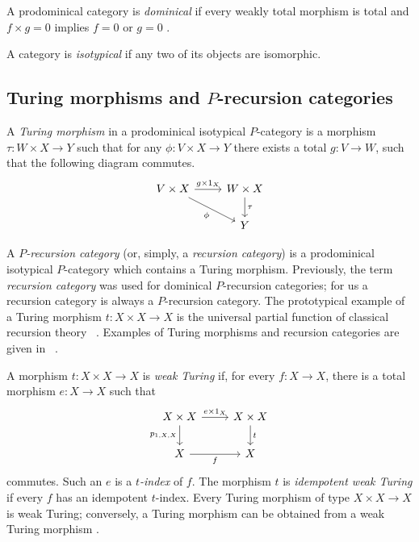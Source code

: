 \documentclass[letterpaper,10pt]{amsart}
\theoremstyle{plain}
\theoremstyle{definition}
\newcommand{\MAP}[3]{{#1}:{#2}\rightarrow{#3}}
\begin{document}
A prodominical category is \textit{dominical} if every weakly total
morphism is total and $f\times g=0$ implies $f=0$ or $g=0$
\cite[p.~36]{leng}.

A category is \textit{isotypical} if any two of its objects are isomorphic.

\subsection{Turing morphisms and \texorpdfstring{$P$}{P}-recursion categories}
A {\it Turing morphism} in a prodominical isotypical $P$-category is a morphism %
$\MAP{\tau}{W\times X}{Y}$ such that for any $\MAP{\phi}{V\times
X}{Y}$ there exists a total $\MAP{g}{V}{W}$, such that the
following diagram commutes.
\[
\begin{tikzcd}
V\times X \arrow[r,"g\times1_X"] \arrow[dr,"\phi"']
  & W\times X \arrow[d,"\tau"] \\
  & Y
\end{tikzcd}
\]

A {\it $P$-recursion category} (or, simply, a {\it recursion
category}) is a prodominical isotypical $P$-category  which contains a Turing
morphism. Previously, the term {\it recursion category}
was used for dominical $P$-recursion categories; for us a recursion category
is always a $P$-recursion category. The prototypical example of a Turing morphism $\MAP{t}{X\times X}{X}$ is the universal partial function of classical 
recursion theory ~\cite[Theorem II.1.8, page 132]{MR90d:03072}. Examples of Turing morphisms and recursion categories are given in ~\cite{MR88i:03078,MR90i:03046,MR92e:03067,MR93b:03103,MR95c:03110,leng}.

A morphism $t:X\times X\to X$ is \textit{weak Turing} if, for every
$f:X\to X$, there is a total morphism $e:X\to X$ such that
\begin{equation}\label{DefWeak}
\begin{tikzcd}
X\times X \arrow[r,"e\times1_X"] \arrow[d,"p_{1,X,X}"']
  & X\times X \arrow[d,"t"] \\
X \arrow[r,"f"'] & X
\end{tikzcd}
\end{equation}
commutes. Such an $e$ is a \textit{$t$-index} of $f$. The morphism $t$
is \textit{idempotent weak Turing} if every $f$ has an idempotent
$t$-index. Every Turing morphism of type $X\times X\to X$ is weak
Turing; conversely, a Turing morphism can be obtained from a weak Turing
morphism \cite[Lemma 9.1]{MR92e:03067}.
\end{document}
